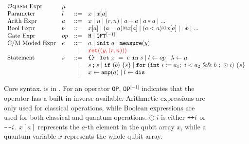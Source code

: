 \begin{figure}[t]
{
  \small
  \[\begin{array}{llcl} 
      \text{\oqasm Expr} & \mu\\
      \text{Parameter} & l & ::= & x \mid x[a] \\
      \text{Arith Expr} & a & ::= & x \mid n \mid (r,n) \mid a + a \mid a * a \mid ... \\
      \text{Bool Expr} & b & ::= & x[a] \mid (a = a) @ x[a] \mid (a < a) @ x[a] \mid \neg b \mid ... \\
      \text{Gate Expr} & op & ::= & \texttt{H} \mid \iqft[\lbrack -1 \rbrack]{}{} \\
      \text{C/M Moded Expr}& e & ::= & a \mid \sinit{a} \mid \smea{y}  \\
                           && \mid & \textcolor{red}{\sret{(y,(r,n))}} \\
      \text{Statement} & s & ::= & \sskip \mid \sexp{x}{e}{s} \mid  \ssassign{l}{}{op} \mid \ssassign{\lambda}{}{\mu} 
                                 \\ & & \mid & \sseq{s}{s} \mid \sifq{b}{s} \mid
                                     \sqwhile{\sint{i}{a_1}}{i<a_2}{b}{\odot \;i}{s}
                     \\&&\mid & \ssassign{x}{}{\samp{a}}
                      \mid \ssassign{l}{}{\sdis}
    \end{array}
  \]
}
  \caption{Core \qafny syntax. \oqasm is in . For an operator \texttt{OP}, $\texttt{OP}^{\lbrack -1 \rbrack}$ indicates that the operator has a built-in inverse available. Arithmetic expressions are only used for classical operations, while Boolean expressions are used for both classical and quantum operations. $\odot \;i$ is either $\texttt{++}i$ or $\texttt{-\hspace{0.1em}-}i$. $x[a]$ represents the $a$-th element in the qubit array $x$, while a quantum variable $x$ represents the whole qubit array. }
  \label{fig:vqimp}
\end{figure}

